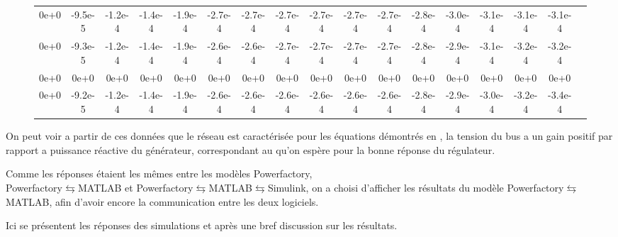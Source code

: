 \begin{sidewaysfigure}
\begin{table}[H]
{\begin{tabular}{ccccccccccccccccc}
				0e+0& -9.5e-5& -1.2e-4& -1.4e-4& -1.9e-4& -2.7e-4& -2.7e-4& -2.7e-4& -2.7e-4& -2.7e-4& -2.7e-4& -2.8e-4& -3.0e-4& -3.1e-4& -3.1e-4& -3.1e-4\\
				0e+0& -9.3e-5& -1.2e-4& -1.4e-4& -1.9e-4& -2.6e-4& -2.6e-4& -2.7e-4& -2.7e-4& -2.7e-4& -2.7e-4& -2.8e-4& -2.9e-4& -3.1e-4& -3.2e-4& -3.2e-4\\
				0e+0& 0e+0& 0e+0& 0e+0& 0e+0& 0e+0& 0e+0& 0e+0& 0e+0& 0e+0& 0e+0& 0e+0& 0e+0& 0e+0& 0e+0& 0e+0\\
				0e+0& -9.2e-5& -1.2e-4& -1.4e-4& -1.9e-4& -2.6e-4& -2.6e-4& -2.6e-4& -2.6e-4& -2.6e-4& -2.6e-4& -2.8e-4& -2.9e-4& -3.0e-4& -3.2e-4& -3.4e-4
				\\
		\end{tabular}}
	\end{table} 
	
\end{sidewaysfigure}
\vspace{1em}
On peut voir a partir de ces données que le réseau est caractérisée pour les équations démontrés en \cite{cosson:tel-01374469}, la tension du bus a un gain positif par rapport a puissance réactive du générateur, correspondant au qu'on espère pour la bonne réponse du régulateur.

Comme les réponses étaient les mêmes entre les modèles Powerfactory,\\ Powerfactory$ \leftrightarrows $MATLAB et Powerfactory$ \leftrightarrows $MATLAB$ \leftrightarrows $Simulink, on a choisi d'afficher les résultats du modèle Powerfactory$ \leftrightarrows $MATLAB, afin d'avoir encore la communication entre les deux logiciels.

 Ici se présentent les réponses des simulations et après une bref discussion sur les résultats.
